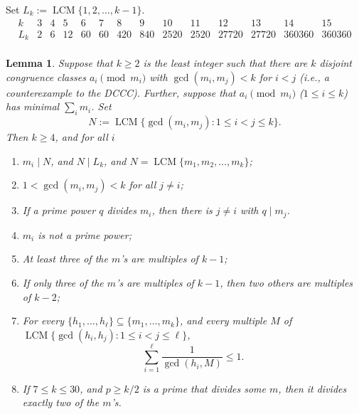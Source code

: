\documentclass[12pt]{article}
\DeclareMathOperator{\lcm}{LCM}
\newtheorem{lem}[thm]{Lemma}
\begin{document}
Set $L_{k}:= \lcm\{1,2,\dots,k-1\}$.
\[ \begin{array}{c|ccccccccccccc}
    k   & 3 & 4 & 5 & 6 & 7 & 8 & 9 & 10 & 11 & 12 & 13 & 14 & 15\\\hline
    L_k & 2 & 6 &12 &60 &60 &420& 840& 2520&2520& 27720 & 27720 & 360360 & 360360 \\
    \end{array}
\]

\begin{lem}\label{lem:G}
Suppose that $k\ge 2$ is the least integer such that there are $k$ disjoint congruence classes $a_i\pmod{m_i}$
with $\gcd(m_i,m_j)<k$ for $i<j$ (i.e., a counterexample to the DCCC). Further, suppose that $a_i\pmod{m_i}$
($1\le i \le k$) has minimal $\sum_i m_i$. Set
    \[N:=\lcm\{\gcd(m_i,m_j) \colon 1\le i<j\le k\}. \]
Then $k\ge 4$, and for all $i$
    \begin{enumerate}
        \item   $m_i \mid N$, and $N \mid L_k$, and $N=\lcm\{m_1,m_2,\dots,m_k\}$;\label{item:Lk}
        \item   $1<\gcd(m_i,m_j)<k$ for all $j\not=i$;\label{item:gcd}
        \item   If a prime power $q$ divides $m_i$, then there is $j\not=i$ with $q \mid m_j$.\label{item:share}
        \item   $m_i$ is not a prime power;\label{item:primepower}
        \item   At least three of the $m$'s are multiples of $k-1$;\label{item:minimal}
        \item   If only three of the $m$'s are multiples of $k-1$, then two others are multiples of
        $k-2$;\label{item:minimal2}
        \item   For every $\{h_1,\dots,h_\ell\}\subseteq\{m_1,\dots,m_k\}$, and every multiple $M$ of \newline
        \mbox{$\lcm\{\gcd(h_i,h_j)\colon 1\le i<j\le\ell\}$},
            \[\sum_{i=1}^\ell \frac1{\gcd(h_i,M)} \le 1.\]  \label{item:test}
        \item   If $7\le k \le 30$, and $p\ge k/2$ is a prime that divides some $m$, then it divides exactly two
        of the $m$'s.\label{item:bigprime}
    \end{enumerate}
\end{lem}
\end{document}
